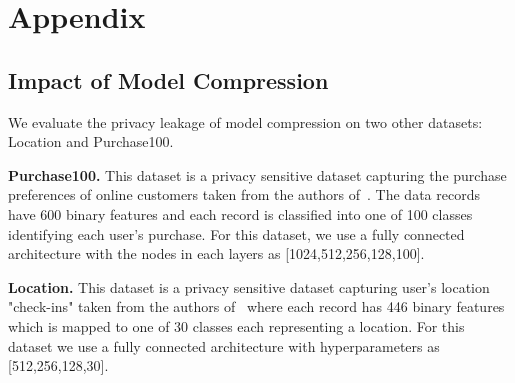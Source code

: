 \section*{Appendix}

\subsection{Impact of Model Compression}

We evaluate the privacy leakage of model compression on two other datasets: Location and Purchase100.

\noindent\textbf{Purchase100.} This dataset is a privacy sensitive dataset capturing the purchase preferences of online customers taken from the authors of~\cite{shokri2017membership}.
The data records have 600 binary features and each record is classified into one of 100 classes identifying each user's purchase.
For this dataset, we use a fully connected architecture with the nodes in each layers as [1024,512,256,128,100].

\noindent\textbf{Location.} This dataset is a privacy sensitive dataset capturing user's location "check-ins" taken from the authors of~\cite{shokri2017membership} where each record has 446 binary features which is mapped to one of 30 classes each representing a location. For this dataset we use a fully connected architecture with hyperparameters as [512,256,128,30].

